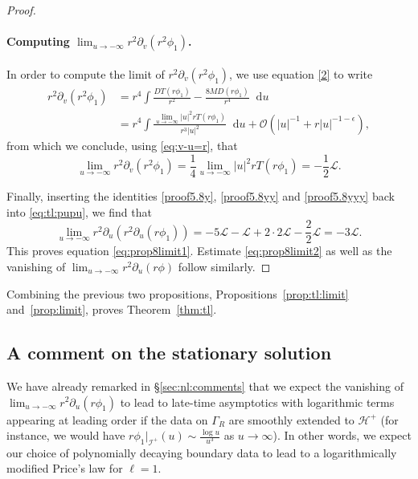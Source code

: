 \documentclass[11pt,english]{article}
\numberwithin{equation}{section}
\theoremstyle{remark}
\theoremstyle{plain}
\theoremstyle{remark}
\newcommand{\dd}{\mathop{}\!\mathrm{d}}
\newcommand{\pu}{\partial_u}
\newcommand{\pv}{\partial_v}
\renewcommand{\(}{\left(}
\renewcommand{\)}{\right)}
\begin{document}
\begin{proof}
\paragraph{Computing $\lim_{u\to-\infty}r^2\pv(r^2\phi_1)$.}
In order to compute the limit of $r^2\pv(r^2\phi_1)$, we use equation \eqref{2} to write
\begin{align*}
r^2\pv(r^2\phi_1)&=r^4\int \frac{DT(r\phi_1)}{r^2}-\frac{8MD(r\phi_1)}{r^4}\dd u\\
				 &=r^4\int \frac{\lim_{u\to-\infty} |u|^2 r T(r\phi_1)}{r^3|u|^2}\dd u+\mathcal{O}(|u|^{-1}+r|u|^{-1-\epsilon}),
\end{align*}
from which we conclude, using \eqref{eq:v-u=r}, that
\begin{equation}\label{proof5.8yyy}
\lim_{u\to-\infty}r^2\pv(r^2\phi_1)=\frac14 \lim_{u\to-\infty}|u|^2r T(r\phi_1)=-\frac12\mathcal{L}.
\end{equation}

Finally, inserting the identities \eqref{proof5.8y}, \eqref{proof5.8yy} and \eqref{proof5.8yyy} back into \eqref{eq:tl:pupu}, we find that
\begin{equation}
\lim_{u\to-\infty}r^2\pu(r^2\pu(r\phi_1))=-5\mathcal{L}-\mathcal{L}+2\cdot2\mathcal{L}-\frac{2}{2}\mathcal{L}=-3\mathcal{L}.
\end{equation}
This proves equation \eqref{eq:prop8limit1}. Estimate \eqref{eq:prop8limit2} as well as the vanishing of $\lim_{u\to-\infty}r^2\pu(r\phi)$ follow similarly.
\end{proof}
Combining the previous two propositions, Propositions~\ref{prop:tl:limit} and~\ref{prop:limit}, proves Theorem~\ref{thm:tl}.



\subsection{A comment on the stationary solution}\label{sec:tl:comments}
We have already remarked in \S\ref{sec:nl:comments} that we expect the vanishing of $\lim_{u\to-\infty} r^2\pu(r\phi_1)$ to lead to late-time asymptotics with logarithmic terms appearing at leading order if the data on $\Gamma_R$ are smoothly extended to $\mathcal{H}^+$ (for instance, we would have $r\phi_1|_{\mathcal{I}^+}(u)\sim \frac{\log u}{u^3}$ as $u\to\infty$).
 In other words, we expect our choice of polynomially decaying boundary data to lead to a logarithmically modified Price's law for $\ell=1$.
\end{document}
